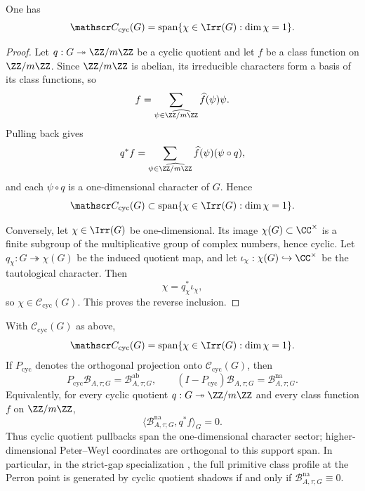 \begin{lemma}
  \label{lem:cyclic-quotients-one-dimensional-characters}
  One has
  \[
    \mathscr C_{\mathrm{cyc}}(G)
    =
    \operatorname{span}\{\chi\in\Irr(G):\dim\chi=1\}.
  \]
\end{lemma}

\begin{proof}
  Let \(q:G\twoheadrightarrow \ZZ/m\ZZ\) be a cyclic quotient and let
  \(f\) be a class function on \(\ZZ/m\ZZ\). Since \(\ZZ/m\ZZ\) is
  abelian, its irreducible characters form a basis of its class
  functions, so
  \[
    f=\sum_{\psi\in\widehat{\ZZ/m\ZZ}}\widehat f(\psi)\psi.
  \]
  Pulling back gives
  \[
    q^\ast f
    =
    \sum_{\psi\in\widehat{\ZZ/m\ZZ}}
      \widehat f(\psi)(\psi\circ q),
  \]
  and each \(\psi\circ q\) is a one-dimensional character of \(G\).
  Hence
  \[
    \mathscr C_{\mathrm{cyc}}(G)
    \subset
    \operatorname{span}\{\chi\in\Irr(G):\dim\chi=1\}.
  \]

  Conversely, let \(\chi\in\Irr(G)\) be one-dimensional. Its image
  \(\chi(G)\subset\CC^\times\) is a finite subgroup of the multiplicative
  group of complex numbers, hence cyclic. Let
  \(q_\chi:G\twoheadrightarrow \chi(G)\) be the induced quotient map,
  and let \(\iota_\chi:\chi(G)\hookrightarrow \CC^\times\) be the
  tautological character. Then
  \[
    \chi=q_\chi^\ast\iota_\chi,
  \]
  so \(\chi\in\mathscr C_{\mathrm{cyc}}(G)\). This proves the reverse
  inclusion.
\end{proof}

\begin{corollary}
  \label{thm:cyclic-detection-boundary}
  With \(\mathscr C_{\mathrm{cyc}}(G)\) as above,
  \[
    \mathscr C_{\mathrm{cyc}}(G)
    =
    \operatorname{span}\{\chi\in\Irr(G):\dim\chi=1\}.
  \]
  If \(P_{\mathrm{cyc}}\) denotes the orthogonal projection onto
  \(\mathscr C_{\mathrm{cyc}}(G)\), then
  \[
    P_{\mathrm{cyc}}\mathcal B_{A,\tau;G}=\mathcal B_{A,\tau;G}^{\mathrm{ab}},
    \qquad
    (I-P_{\mathrm{cyc}})\mathcal B_{A,\tau;G}=\mathcal B_{A,\tau;G}^{\mathrm{na}}.
  \]
  Equivalently, for every cyclic quotient \(q:G\twoheadrightarrow \ZZ/m\ZZ\)
  and every class function \(f\) on \(\ZZ/m\ZZ\),
  \[
    \langle \mathcal B_{A,\tau;G}^{\mathrm{na}},q^\ast f\rangle_G=0.
  \]
  Thus cyclic quotient pullbacks span the one-dimensional character sector;
  higher-dimensional Peter--Weyl coordinates are orthogonal to this support
  span.
  In particular, in the strict-gap specialization
  , the full
  primitive class profile at the Perron point is generated by cyclic quotient
  shadows if and only if
  \(\mathcal B_{A,\tau;G}^{\mathrm{na}}\equiv 0\).
\end{corollary}

